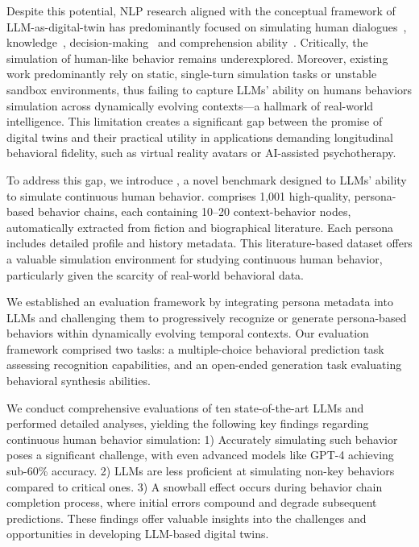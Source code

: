 Despite this potential, NLP research aligned with the conceptual framework of LLM-as-digital-twin has predominantly focused on simulating human dialogues~\cite{shen2024roleeval}, knowledge~\cite{shen2024roleeval}, decision-making~\cite{xu2024character} and comprehension ability~\cite{yuan2024evaluating}.
Critically, the simulation of human-like behavior remains underexplored.
Moreover, existing work predominantly rely on static, single-turn simulation tasks or unstable sandbox environments, thus failing to capture LLMs' ability on humans behaviors simulation across dynamically evolving contexts—a hallmark of real-world intelligence. 
This limitation creates a significant gap between the promise of digital twins and their practical utility in applications demanding longitudinal behavioral fidelity, such as virtual reality avatars or AI-assisted psychotherapy.



To address this gap, we introduce \datasetname, a novel benchmark designed to LLMs' ability to simulate continuous human behavior. 
\datasetname comprises 1,001 high-quality, persona-based behavior chains, each containing 10–20 context-behavior nodes, automatically extracted from fiction and biographical literature.  Each persona includes detailed profile and history metadata. This literature-based dataset offers a valuable simulation environment for studying continuous human behavior, particularly given the scarcity of real-world behavioral data.



We established an evaluation framework by integrating persona metadata into LLMs and challenging them to progressively recognize or generate persona-based behaviors within dynamically evolving temporal contexts.  
Our evaluation framework comprised two tasks: a multiple-choice behavioral prediction task assessing recognition capabilities, and an open-ended generation task evaluating behavioral synthesis abilities.  

We conduct comprehensive evaluations of ten state-of-the-art LLMs and performed detailed analyses, yielding the following key findings regarding continuous human behavior simulation:
1) Accurately simulating such behavior poses a significant challenge, with even advanced models like GPT-4 achieving sub-60\% accuracy.
2) LLMs are less proficient at simulating non-key behaviors compared to critical ones.
3) A snowball effect occurs during behavior chain completion process, where initial errors compound and degrade subsequent predictions. These findings offer valuable insights into the challenges and opportunities in developing LLM-based digital twins.


















